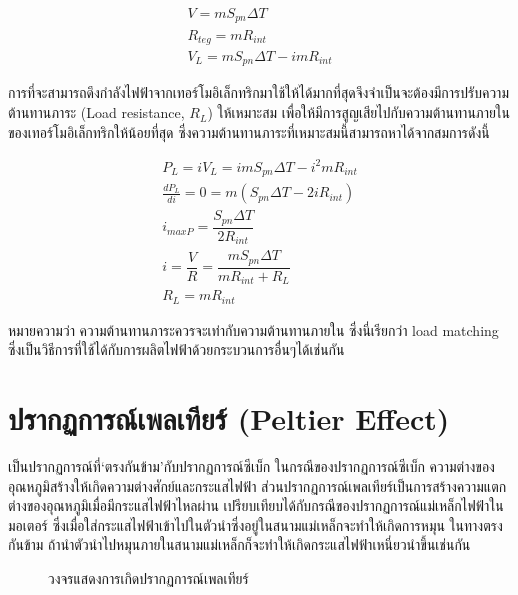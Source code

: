 \message{ !name(solar.tex)}\documentclass[
a4paper,
svgnames,
openany,
justified,
]{tufte-book}
\begin{document}
\begin{gather}
  V = m S_{pn} \Delta T \\
  R_{teg} = m R_{int} \\
  V_L = m S_{pn} \Delta T - i mR_{int}
\end{gather}

การที่จะสามารถดึงกำลังไฟฟ้าจากเทอร์โมอิเล็กทริกมาใช้ให้ได้มากที่สุดจึงจำเป็นจะต้องมีการปรับความต้านทานภาระ (Load resistance, $R_L$) ให้เหมาะสม เพื่อให้มีการสูญเสียไปกับความต้านทานภายในของเทอร์โมอิเล็กทริกให้น้อยที่สุด ซึ่งความต้านทานภาระที่เหมาะสมนี้สามารถหาได้จากสมการดังนี้

\begin{gather}
  P_L = iV_L = i m S_{pn} \Delta T - i^2 m R_{int} \\
  \frac{d P_L}{d i } = 0 = m(S_{pn} \Delta T - 2 i R_{int}) \\
  i_{max P} = \dfrac{S_{pn} \Delta T}{2 R_{int}} \\
  i = \dfrac{V}{R} = \dfrac{ m S_{pn} \Delta T }{ m R_{int} + R_L } \\
  R_L = m R_{int}
\end{gather}

หมายความว่า ความต้านทานภาระควรจะเท่ากับความต้านทานภายใน ซึ่งนี่เรียกว่า load matching ซึ่งเป็นวิธีการที่ใช้ได้กับการผลิตไฟฟ้าด้วยกระบวนการอื่นๆได้เช่นกัน

\section{ปรากฏการณ์เพลเทียร์ (Peltier Effect)}

เป็นปรากฏการณ์ที่`ตรงกันข้าม'กับปรากฏการณ์ซีเบ็ก ในกรณีของปรากฏการณ์ซีเบ็ก ความต่างของอุณหภูมิสร้างให้เกิดความต่างศักย์และกระแสไฟฟ้า ส่วนปรากฏการณ์เพลเทียร์เป็นการสร้างความแตกต่างของอุณหภูมิเมื่อมีกระแสไฟฟ้าไหลผ่าน เปรียบเทียบได้กับกรณีของปรากฏการณ์แม่เหล็กไฟฟ้าในมอเตอร์ ซึ่งเมื่อใส่กระแสไฟฟ้าเข้าไปในตัวนำซึ่งอยู่ในสนามแม่เหล็กจะทำให้เกิดการหมุน ในทางตรงกันข้าม ถ้านำตัวนำไปหมุนภายในสนามแม่เหล็กก็จะทำให้เกิดกระแสไฟฟ้าเหนี่ยวนำขึ้นเช่นกัน

\begin{figure}[h]
  \centering
  \caption{วงจรแสดงการเกิดปรากฏการณ์เพลเทียร์}
\end{figure}
\end{document}
